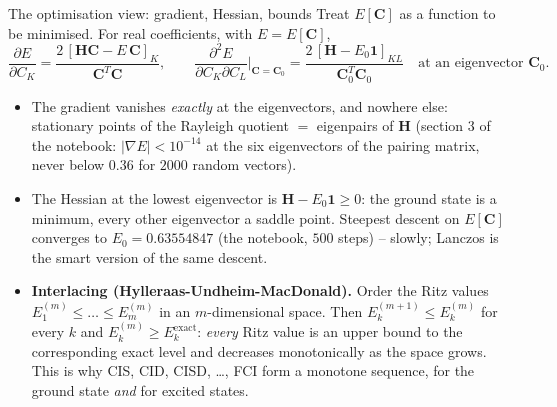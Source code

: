 \documentclass[aspectratio=169,10pt]{beamer}
\begin{document}
\begin{frame}{The optimisation view: gradient, Hessian, bounds}
  \small
  Treat $E[\bm{C}]$ as a function to be minimised. For real coefficients, with $E=E[\bm{C}]$,
  \[
    \frac{\partial E}{\partial C_K}=\frac{2\,[\bm{H}\bm{C}-E\,\bm{C}]_K}{\bm{C}^{T}\bm{C}},
    \qquad
    \frac{\partial^2E}{\partial C_K\partial C_L}\Big|_{\bm{C}=\bm{C}_0}=\frac{2\,[\bm{H}-E_0\bm{1}]_{KL}}{\bm{C}_0^{T}\bm{C}_0}\quad\text{at an eigenvector }\bm{C}_0 .
  \]
  \begin{itemize}
    \item The gradient vanishes \emph{exactly} at the eigenvectors, and nowhere else: stationary points of the Rayleigh quotient $=$ eigenpairs of $\bm{H}$ (section 3 of the notebook: $|\nabla E|<10^{-14}$ at the six eigenvectors of the pairing matrix, never below $0.36$ for $2000$ random vectors).
    \item The Hessian at the lowest eigenvector is $\bm{H}-E_0\bm{1}\ge0$: the ground state is a \alert{minimum}, every other eigenvector a saddle point. Steepest descent on $E[\bm{C}]$ converges to $E_0=0.63554847$ (the notebook, $500$ steps) -- slowly; Lanczos is the smart version of the same descent.
    \item \textbf{Interlacing (Hylleraas-Undheim-MacDonald).} Order the Ritz values $E_1^{(m)}\le\dots\le E_m^{(m)}$ in an $m$-dimensional space. Then $E_k^{(m+1)}\le E_k^{(m)}$ for every $k$ and $E_k^{(m)}\ge E_k^{\mathrm{exact}}$: \emph{every} Ritz value is an upper bound to the corresponding exact level and decreases monotonically as the space grows. This is why CIS, CID, CISD, \dots, FCI form a monotone sequence, for the ground state \emph{and} for excited states.
  \end{itemize}
\end{frame}
\end{document}
